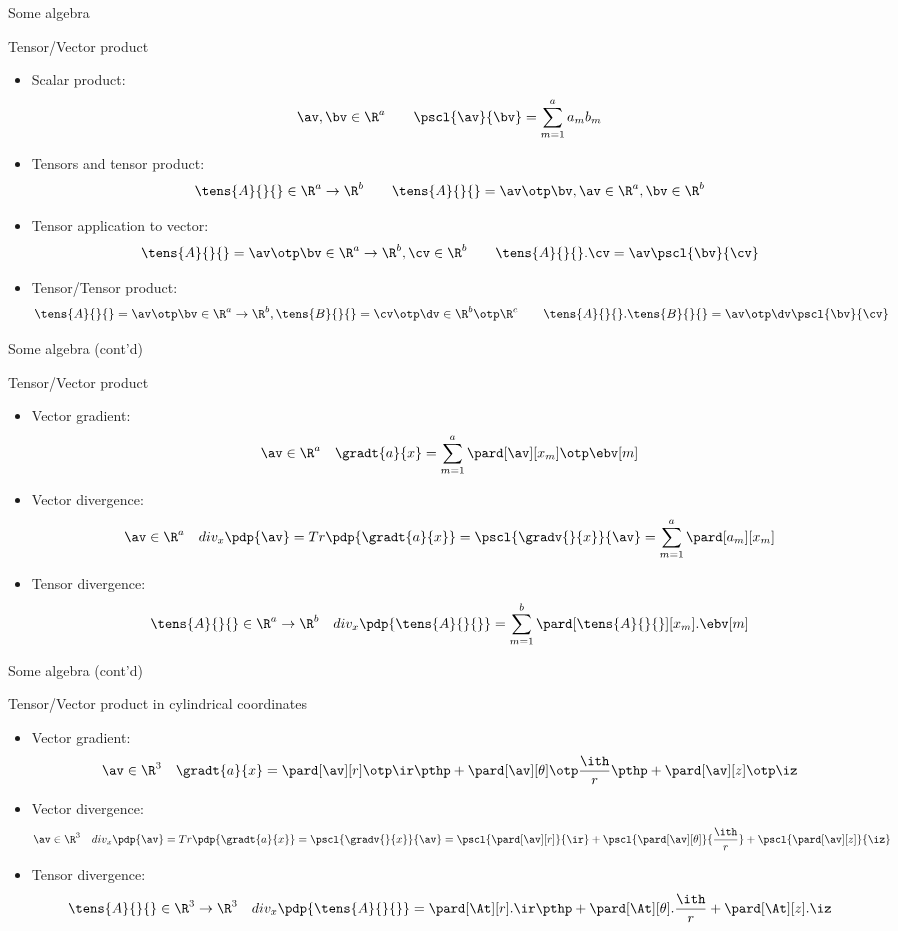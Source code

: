 \label{sec:algebra_recap}
\begin{frame}{Some algebra}
	\begin{block}{Tensor/Vector product}
		{\scriptsize
		\begin{itemize}
			\item Scalar product: $$\av,\bv \in \R^a\quad\quad\pscl{\av}{\bv}=\sum_{m=1}^aa_mb_m$$
			\item Tensors and tensor product: $$\tens{A}{}{}\in\R^a\to\R^b\quad\quad \tens{A}{}{}=\av\otp\bv, \av\in\R^a, \bv\in\R^b$$
			\item Tensor application to vector: $$\tens{A}{}{}=\av\otp\bv\in\R^a\to\R^b, \cv\in\R^b\quad\quad \tens{A}{}{}.\cv=\av\pscl{\bv}{\cv}$$

			\item Tensor/Tensor product: 
			$$\tens{A}{}{}=\av\otp\bv\in\R^a\to\R^b, \tens{B}{}{}=\cv\otp\dv\in\R^b\otp\R^c\quad\quad \tens{A}{}{}.\tens{B}{}{}=\av\otp\dv\pscl{\bv}{\cv}$$
		\end{itemize}
	}
	\end{block}
\end{frame}


\begin{frame}{Some algebra (cont'd)}
	\begin{block}{Tensor/Vector product}
		{\scriptsize
		\begin{itemize}
			\item Vector gradient:
			$$\av\in\R^a\quad\gradt{a}{x}=\sum_{m=1}^{a}\pard[\av][x_m]\otp\ebv[m]$$
			\item Vector divergence:
			$$\av\in\R^a\quad div_x\pdp{\av}=Tr\pdp{\gradt{a}{x}}=\pscl{\gradv{}{x}}{\av}=\sum_{m=1}^a\pard[a_m][x_m]$$
			\item Tensor divergence:
			$$\tens{A}{}{}\in\R^a\to\R^b\quad div_x\pdp{\tens{A}{}{}}=\sum_{m=1}^b\pard[\tens{A}{}{}][x_m].\ebv[m]$$
		\end{itemize}
	}
	\end{block}
\end{frame}


\begin{frame}{Some algebra (cont'd)}
	\begin{block}{Tensor/Vector product in cylindrical coordinates}
		{\scriptsize
			\begin{itemize}
				\item Vector gradient:
				$$\av\in\R^3\quad\gradt{a}{x}=\pard[\av][r]\otp\ir\pthp+\pard[\av][\theta]\otp\frac{\ith}{r}\pthp+\pard[\av][z]\otp\iz$$
				\item Vector divergence:
				$$\av\in\R^3\quad div_x\pdp{\av}=Tr\pdp{\gradt{a}{x}}=\pscl{\gradv{}{x}}{\av}=\pscl{\pard[\av][r]}{\ir}+\pscl{\pard[\av][\theta]}{\frac{\ith}{r}}+\pscl{\pard[\av][z]}{\iz}$$
				\item Tensor divergence:
				$$\tens{A}{}{}\in\R^3\to\R^3\quad div_x\pdp{\tens{A}{}{}}=\pard[\At][r].\ir\pthp+\pard[\At][\theta].\frac{\ith}{r}+\pard[\At][z].\iz$$
			\end{itemize}
		}
	\end{block}
\end{frame}